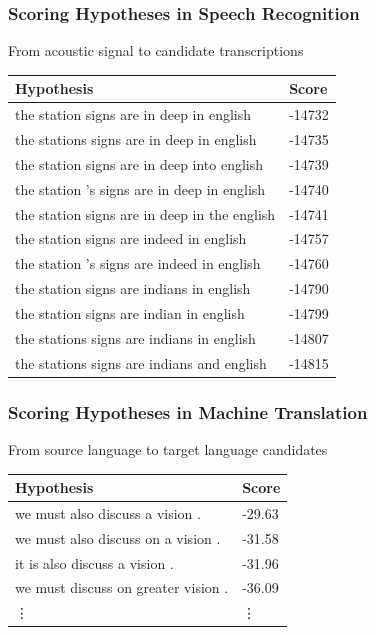 \begin{frame}
\frametitle{Scoring Hypotheses in Speech Recognition}
\centering
\begin{block}{From acoustic signal to candidate transcriptions}
\begin{tabular}{ll}
\rowcolor{MidnightBlue!50}
Hypothesis & Score \\
\hline
the station signs are in deep in english & -14732 \\
the stations signs are in deep in english & -14735 \\
the station signs are in deep into english & -14739 \\
the station 's signs are in deep in english & -14740 \\
the station signs are in deep in the english & -14741 \\
the station signs are indeed in english & -14757 \\
the station 's signs are indeed in english & -14760 \\ 
the station signs are indians in english & -14790 \\
the station signs are indian in english & -14799 \\
the stations signs are indians in english & -14807 \\
the stations signs are indians and english & -14815 
\end{tabular}
\end{block}
\end{frame}

\begin{frame}[fragile]
\frametitle{Scoring Hypotheses in Machine Translation}
\centering
\begin{block}{From source language to target language candidates}
\begin{tabular}{ll}
\rowcolor{MidnightBlue!50}
Hypothesis & Score \\
\hline
we must also discuss a vision . & -29.63 \\
we must also discuss on a vision . & -31.58 \\
it is also discuss a vision . & -31.96 \\
we must discuss on greater vision . & -36.09 \\
\vdots & \vdots \\
\end{tabular}
\end{block}
\end{frame}

